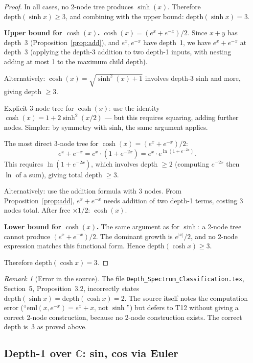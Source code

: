 \documentclass[12pt,a4paper]{article}
\theoremstyle{definition}
\theoremstyle{remark}
\newtheorem{remark}[theorem]{Remark}
\begin{document}
\begin{proof}
In all cases, no 2-node tree produces $\sinh(x)$.  Therefore $\mathrm{depth}(\sinh x) \geq 3$,
and combining with the upper bound: $\mathrm{depth}(\sinh x) = 3$.

\medskip
\textbf{Upper bound for $\cosh(x)$.}
$\cosh(x) = (e^x + e^{-x})/2$.  Since $x + y$ has depth~3 (Proposition~\ref{prop:add}),
and $e^x, e^{-x}$ have depth~1, we have $e^x + e^{-x}$ at depth~3 (applying the depth-3
addition to two depth-1 inputs, with nesting adding at most 1 to the maximum child depth).

Alternatively: $\cosh(x) = \sqrt{\sinh^2(x) + 1}$ involves depth-3 sinh and more,
giving depth $\geq 3$.

Explicit 3-node tree for $\cosh(x)$: use the identity $\cosh(x) = 1 + 2\sinh^2(x/2)$
--- but this requires squaring, adding further nodes.  Simpler:
by symmetry with sinh, the same argument applies.

The most direct 3-node tree for $\cosh(x) = (e^x + e^{-x})/2$:
\[
  e^x + e^{-x}
  = e^x \cdot (1 + e^{-2x})
  = e^x \cdot e^{\ln(1+e^{-2x})}.
\]
This requires $\ln(1+e^{-2x})$, which involves depth $\geq 2$ (computing $e^{-2x}$
then $\ln$ of a sum), giving total depth $\geq 3$.

Alternatively: use the addition formula with 3 nodes.
From Proposition~\ref{prop:add}, $e^x + e^{-x}$ needs addition of two depth-1
terms, costing 3 nodes total.  After free $\times 1/2$: $\cosh(x)$.

\textbf{Lower bound for $\cosh(x)$.}  The same argument as for $\sinh$:
a 2-node tree cannot produce $(e^x + e^{-x})/2$.  The dominant growth is $e^{|x|}/2$,
and no 2-node expression matches this functional form.  Hence $\mathrm{depth}(\cosh x) \geq 3$.

Therefore $\mathrm{depth}(\cosh x) = 3$.
\end{proof}

\begin{remark}[Error in the source]
The file \texttt{Depth\_Spectrum\_Classification.tex}, Section~5, Proposition~3.2,
incorrectly states $\mathrm{depth}(\sinh x) = \mathrm{depth}(\cosh x) = 2$.  The
source itself notes the computation error (``$\mathrm{eml}(x,e^{-x}) = e^x + x$,
not $\sinh$'') but defers to T12 without giving a correct 2-node construction,
because no 2-node construction exists.  The correct depth is~3 as proved above.
\end{remark}

\subsection{Depth-1 over $\mathbb{C}$: sin, cos via Euler}
\end{document}
